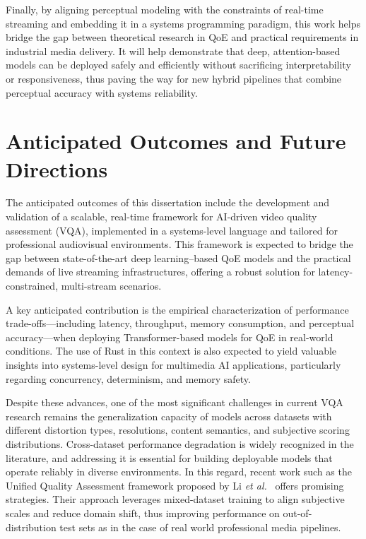 Finally, by aligning perceptual modeling with the constraints of real-time streaming and embedding it in a systems programming paradigm, this work helps bridge the gap between theoretical research in QoE and practical requirements in industrial media delivery. It will help demonstrate that deep, attention-based models can be deployed safely and efficiently without sacrificing interpretability or responsiveness, thus paving the way for new hybrid pipelines that combine perceptual accuracy with systems reliability.

\section{Anticipated Outcomes and Future Directions}

The anticipated outcomes of this dissertation include the development and validation of a scalable, real-time framework for AI-driven video quality assessment (VQA), implemented in a systems-level language and tailored for professional audiovisual environments. This framework is expected to bridge the gap between state-of-the-art deep learning–based QoE models and the practical demands of live streaming infrastructures, offering a robust solution for latency-constrained, multi-stream scenarios.

A key anticipated contribution is the empirical characterization of performance trade-offs—including latency, throughput, memory consumption, and perceptual accuracy—when deploying Transformer-based models for QoE in real-world conditions. The use of Rust in this context is also expected to yield valuable insights into systems-level design for multimedia AI applications, particularly regarding concurrency, determinism, and memory safety.

Despite these advances, one of the most significant challenges in current VQA research remains the generalization capacity of models across datasets with different distortion types, resolutions, content semantics, and subjective scoring distributions. Cross-dataset performance degradation is widely recognized in the literature, and addressing it is essential for building deployable models that operate reliably in diverse environments. In this regard, recent work such as the Unified Quality Assessment framework proposed by Li \textit{et al.}~\cite{li2023unified} offers promising strategies. Their approach leverages mixed-dataset training to align subjective scales and reduce domain shift, thus improving performance on out-of-distribution test sets as in the case of real world professional media pipelines.

